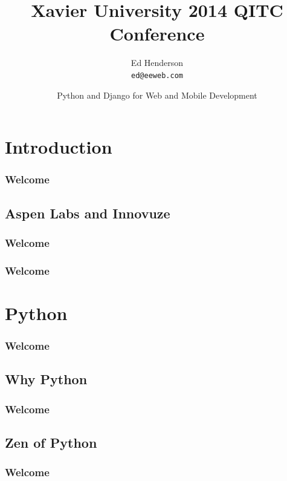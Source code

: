 \documentclass[12pt,presentation]{beamer}
\title{Xavier University 2014 QITC Conference}
\author{Ed Henderson \\ \texttt{ed@eeweb.com}}
\date[ISPN '80]{Python and Django for Web and Mobile Development}
\begin{document}
\frame{\titlepage}

\section[Outline]{}
\frame{\tableofcontents}

\section{Introduction}

\begin{frame}
	\frametitle{Welcome}

\end{frame}

\subsection{Aspen Labs and Innovuze}

\begin{frame}
	\frametitle{Welcome}

\end{frame}

\begin{frame}
	\frametitle{Welcome}

\end{frame}

\section{Python}

\begin{frame}
	\frametitle{Welcome}

\end{frame}

\subsection{Why Python}

\begin{frame}
	\frametitle{Welcome}

\end{frame}

\subsection{Zen of Python}

\begin{frame}
	\frametitle{Welcome}

\end{frame}
\end{document}
